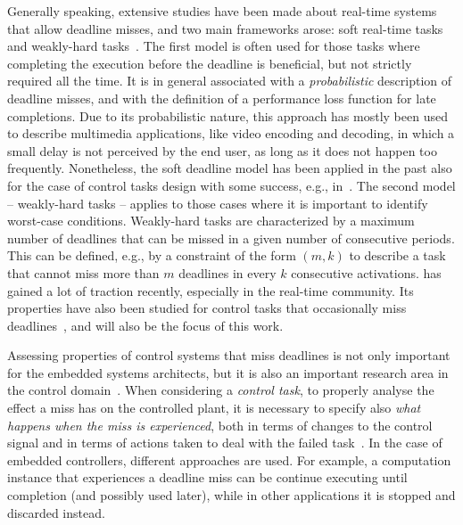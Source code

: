 Generally speaking, extensive studies have been made about real-time systems that allow deadline misses, and two main frameworks arose: soft real-time tasks~\cite{buttazzo2005soft} and weakly-hard tasks~\cite{Bernat:2001}.
The first model is often used for those tasks where completing the execution before the deadline is beneficial, but not strictly required all the time.
It is in general associated with a \emph{probabilistic} description of deadline misses, and with the definition of a performance loss function for late completions.
Due to its probabilistic nature, this approach has mostly been used to describe multimedia applications, like video encoding and decoding, in which a small delay is not perceived by the end user, as long as it does not happen too frequently.
Nonetheless, the soft deadline model has been applied in the past also for the case of control tasks design with some success, e.g., in~\cite{caccamo2002handling, cervin2005control, fontanelli2013soft,fontanelli2013continuous, fontanelli2015optimal}.
The second model -- weakly-hard tasks -- applies to those cases where it is important to identify worst-case conditions. 
Weakly-hard tasks are characterized by a maximum number of deadlines that can be missed in a given number of consecutive periods. 
This can be defined, e.g., by a constraint of the form $(m, k)$ to describe a task that cannot miss more than $m$ deadlines in every $k$ consecutive activations.
 has gained a lot of traction recently, especially in the real-time community. 
Its properties have also been studied for control tasks that occasionally miss deadlines~\cite{ramanathan1999overload, Frehse:2014, Pazzaglia:2018, Maggio:2020}, and will also be the focus of this work.

Assessing properties of control systems that miss deadlines is not only important for the embedded systems architects, but it is also an important research area in the control domain~\cite{Cervin:2005, Linsenmayer:2017, Chakraborty:2018, pazzaglia2021adaptive}.
When considering a \emph{control task}, to properly analyse the effect a miss has on the controlled plant, it is necessary to specify also \emph{what happens when the miss is experienced}, both in terms of changes to the control signal and in terms of actions taken to deal with the failed task~\cite{Pazzaglia:2019}.
In the case of embedded controllers, different approaches are used. 
For example, a computation instance that experiences a deadline miss can be  continue executing until completion (and possibly used later), while in other applications it is stopped and discarded instead.

